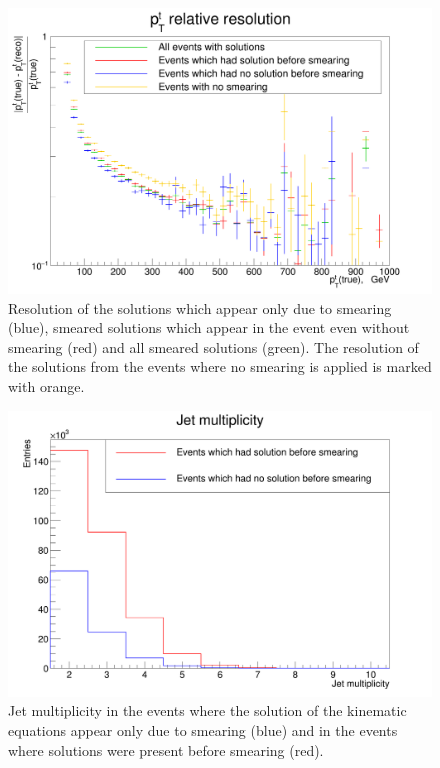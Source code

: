 \begin{figure}[t]
  \centering
  \includegraphics[width=1.0\textwidth]{10_appendices/smearing/ABS_toppt.png}
  \caption{Resolution of the solutions which appear only due to smearing (blue), smeared solutions which appear in the 
  event even without smearing (red) and all smeared solutions (green). The resolution of the solutions from the events
  where no smearing is applied is marked with orange.}
  \label{fig:RMSsmear}
\end{figure}

\begin{figure}[h]
  \centering
  \includegraphics[width=1.0\textwidth]{10_appendices/smearing/Jet_Mult.png}
  \caption{Jet multiplicity in the events where the solution of the kinematic equations appear only due to 
  smearing (blue) and in the events where solutions were present before smearing (red).}
  \label{fig:multSmear}
\end{figure}